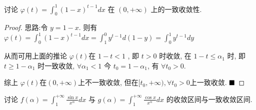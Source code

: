 \documentclass[lang=cn,newtx,10pt,scheme=chinese]{elegantbook}
\begin{document}
\begin{example}
讨论 $\varphi(t) = \int_{0}^{1} (1-x)^{t-1} dx$ 在 $(0, +\infty)$ 上的一致收敛性.
\end{example}

\begin{proof}
思路:令 $y=1-x$. 则有 $\varphi(t) = \int_{0}^{1} (1-x)^{t-1} dx = \int_{1}^{0} y^{t-1} d(1-y) = \int_{0}^{1} y^{t-1} dy$

从而可用上面的推论
$\varphi(t)$在 $1-t < 1$ , 即 $t>0$ 时收敛,
在 $1-t \le \alpha_1$ 时, 即 $t \ge 1-\alpha_1$ 时一致收敛,
$\forall \alpha_1 < 1$ 今 $t_0=1-\alpha_1$, 有 $\forall t_0>0$.

综上 $\varphi(t)$在$(0, +\infty)$上不一致收敛, 但在$[t_0, +\infty), \forall t_0 > 0$上一致收敛.
$\hfill \blacksquare$
\end{proof}

\begin{example}[$\bigstar$]{\label{ex13.2.13}}
讨论 $f(\alpha) = \int_{1}^{+\infty} \frac{\sin x}{x^\alpha} dx$ 与 $g(\alpha) = \int_{1}^{+\infty} \frac{\cos x}{x^\alpha} dx$ 的收敛区间与一致收敛区间.
\end{example}
\end{document}
